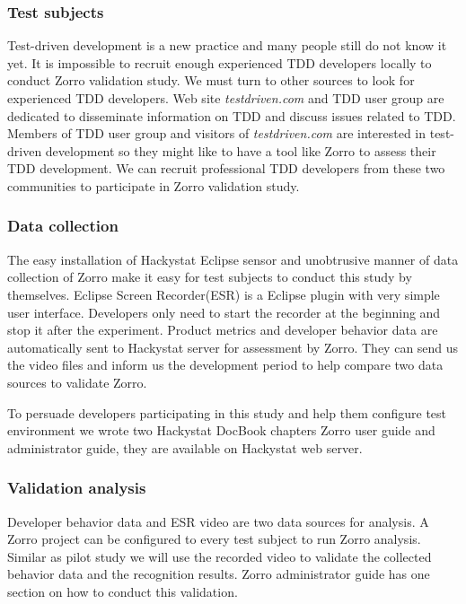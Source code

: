 \subsubsection{Test subjects}
Test-driven development is a new practice and many people still do not know
it yet. It is impossible to recruit enough experienced TDD developers
locally to conduct Zorro validation study. We must turn to other sources to
look for experienced TDD developers. Web site \textit{testdriven.com} and
TDD user group \cite{TddYahooGroup} are dedicated to disseminate
information on TDD and discuss issues related to TDD. Members of TDD user
group and visitors of \textit{testdriven.com} are interested in test-driven
development so they might like to have a tool like Zorro to assess their
TDD development. We can recruit professional TDD developers from these two
communities to participate in Zorro validation study.

\subsubsection{Data collection}
The easy installation of Hackystat Eclipse sensor and unobtrusive manner of
data collection of Zorro make it easy for test subjects to conduct this
study by themselves. Eclipse Screen Recorder(ESR) is a Eclipse plugin with
very simple user interface. Developers only need to start the recorder at
the beginning and stop it after the experiment. Product metrics and
developer behavior data are automatically sent to Hackystat server for
assessment by Zorro. They can send us the video files and inform us the
development period to help compare two data sources to validate Zorro.

To persuade developers participating in this study and help them configure
test environment we wrote two Hackystat DocBook chapters Zorro user guide
and administrator guide, they are available on Hackystat web
server\cite{Hacksytat}.

\subsubsection{Validation analysis}
Developer behavior data and ESR video are two data sources for analysis. A
Zorro project can be configured to every test subject to run Zorro
analysis. Similar as pilot study we will use the recorded video to validate
the collected behavior data and the recognition results. Zorro
administrator guide has one section on how to conduct this validation.

